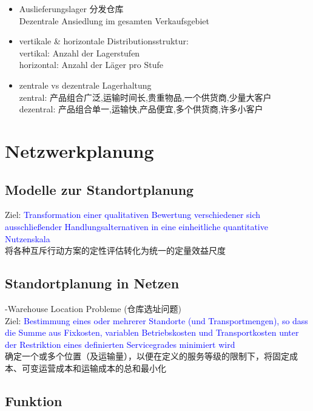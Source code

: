 \documentclass[12pt, letterpaper]{article}
\begin{document}
\begin{CJK*}{UTF8}{gbsn}
\begin{itemize}
\item Auslieferungslager 分发仓库\\
Dezentrale Ansiedlung im gesamten Verkaufsgebiet\\

\item vertikale \& horizontale Distributionsstruktur:\\[1mm]
vertikal: Anzahl der Lagerstufen\\[1mm]
horizontal: Anzahl der Läger pro Stufe
\item zentrale vs dezentrale Lagerhaltung\\[1mm]
zentral: 产品组合广泛,运输时间长,贵重物品,一个供货商,少量大客户\\[1mm]
dezentral: 产品组合单一,运输快,产品便宜,多个供货商,许多小客户\\
\end{itemize}

\newpage
\section{Netzwerkplanung}
\subsection{Modelle zur Standortplanung}
Ziel: \textcolor{blue}{Transformation einer qualitativen Bewertung verschiedener sich ausschließender Handlungsalternativen in eine einheitliche quantitative Nutzenskala}\\[1mm]
将各种互斥行动方案的定性评估转化为统一的定量效益尺度

\subsection{Standortplanung in Netzen}
-Warehouse Location Probleme (仓库选址问题)\\[1mm]
Ziel: \textcolor{blue}{Bestimmung eines oder mehrerer Standorte (und Transportmengen), so dass die Summe aus Fixkosten, variablen Betriebskosten und Transportkosten unter der Restriktion eines definierten Servicegrades minimiert wird}\\[1mm]
确定一个或多个位置（及运输量），以便在定义的服务等级的限制下，将固定成本、可变运营成本和运输成本的总和最小化


\subsection{Funktion}


\end{CJK*}
\end{document}
